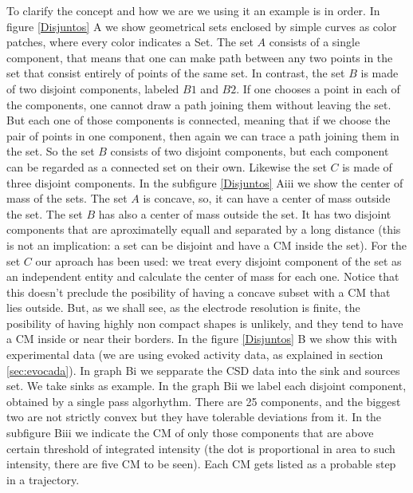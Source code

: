\documentclass{article}
\begin{document}
To clarify the concept and how we are we using it an example is in order. In figure \ref{Disjuntos} A we show geometrical sets enclosed by simple curves as color patches, where every color indicates a Set. The set $A$ consists of a single component, that means that one can make  path between any two points in the set that consist entirely of points of the same set. In contrast, the set $B$ is made of two disjoint components, labeled $B1$ and $B2$. If one chooses a point in each of the components, one cannot draw a path joining them without leaving the set. But each one of those components is connected, meaning that if we choose the pair of points in one component, then again we can trace a path joining them in the set. So the set $B$ consists of two disjoint components, but each component can be regarded as a connected set on their own. Likewise the set $C$ is made of three disjoint components. In the subfigure \ref{Disjuntos} Aiii we show the center of mass of the sets. The set $A$ is concave, so, it can have a center of mass outside the set. The
set $B$ has also a center of mass outside the set. It has two disjoint components that are aproximatelly
equall and separated by a long distance (this is not an implication: a set can be disjoint and have
a CM inside the set). For the set $C$ our aproach has been used: we treat every disjoint component of the
set as an independent entity and calculate the center of mass for each one. Notice that this doesn't preclude the posibility of having a concave subset with a CM that lies outside. But, as we shall see,
as the electrode resolution is finite, the posibility of having highly non compact shapes is unlikely, and they
tend to have a CM inside or near their borders. In the figure \ref{Disjuntos} B we show this with experimental
data (we are using evoked activity data, as explained in section \ref{sec:evocada}). In graph Bi we
sepparate the CSD data into the sink and sources set. We take sinks as example. In the graph Bii
we label each disjoint component, obtained by a single pass algorhythm. There are 25 components, and
the biggest two are not strictly convex but they have tolerable deviations from it. In the
subfigure Biii we indicate the CM of only those components that are above certain threshold of
integrated intensity (the dot is proportional in area to such intensity, there are five CM to be
seen). Each CM gets listed as a probable step in a trajectory.
\end{document}
